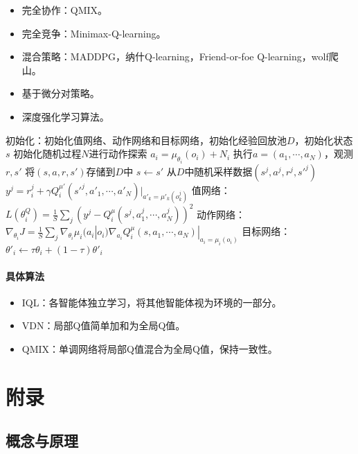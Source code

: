 \documentclass[
12pt, %
a4paper, 
oneside, %
headinclude,footinclude, %
]{scrartcl}
\begin{document}
\begin{itemize}
\item 完全协作：QMIX。
\item 完全竞争：Minimax-Q-learning。
\item 混合策略：MADDPG，纳什Q-learning，Friend-or-foe Q-learning，wolf爬山。
\item 基于微分对策略。
\item 深度强化学习算法。
\end{itemize}
\begin{myalgorithm}[MADDPG]
\State 初始化：初始化值网络、动作网络和目标网络，初始化经验回放池$ D $，初始化状态$ s $
\State 初始化随机过程$ N $进行动作探索
\State $ a_i = \mu_{\theta_i}(o_i) + N_i $ 
\State 执行$ a = (a_1, \cdots, a_N) $，观测$ r, s' $
\State 将$ (s, a, r, s')$存储到$ D $中
\State $ s \leftarrow s'$
\State 从$ D $中随机采样数据$ (s^j, a^j, r^j, s'^j) $
\State $ y^j = r_i^j + \gamma Q_i^{\mu'}(s'^j, a'_1, \cdots, a'_N)|_{a'_k = \mu'_k(o_k^j)} $ 
\State 值网络：$ L(\theta_i^Q) = \frac{1}{S}\sum_j(y^j - Q_i^{\mu}(s^j, a_1^j, \cdots, a_N^j))^2 $ 
\State 动作网络：$ \nabla_{\theta_i}J = \frac{1}{S}\sum_j \nabla_{\theta_i}\mu_i(a_i|o_i)\nabla_{a_i}Q_i^{\mu}(s, a_1, \cdots, a_N)|_{a_i = \mu_i(o_i)}$ 
\State 目标网络：$ \theta'_i \leftarrow \tau \theta_i + (1 - \tau)\theta'_i $
\EndFor
\EndFor
\EndFor
\end{myalgorithm}
\paragraph{具体算法}
\begin{itemize}
\item IQL：各智能体独立学习，将其他智能体视为环境的一部分。
\item VDN：局部Q值简单加和为全局Q值。
\item QMIX：单调网络将局部Q值混合为全局Q值，保持一致性。
\end{itemize}
\section{附录}
\subsection[概念与原理]{概念与原理}
\end{document}
